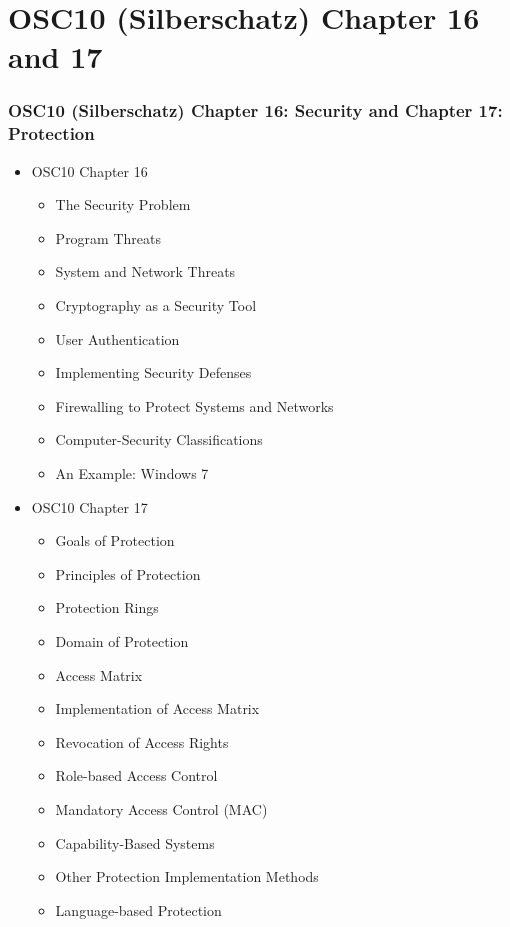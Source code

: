 \documentclass[aspectratio=169, xcolor=table, notheorems, hyperref={pdfpagelabels=false}]{beamer}
\begin{document}
\section{OSC10 (Silberschatz) Chapter 16 and 17}
\begin{frame}
\frametitle{OSC10 (Silberschatz) Chapter 16: Security and Chapter 17: Protection}
\begin{multicols}{2}
  \begin{itemize}
  \item OSC10 Chapter 16
  \begin{itemize}
  \item The Security Problem
  \item Program Threats
  \item System and Network Threats
  \item Cryptography as a Security Tool
  \item User Authentication
  \item Implementing Security Defenses
  \item Firewalling to Protect Systems and Networks
  \item Computer-Security Classifications
  \item An Example: Windows 7
  \end{itemize}
  \end{itemize}
  \vfill \null
\columnbreak
  \begin{itemize}
  \item OSC10 Chapter 17
  \begin{itemize}
  \item Goals of Protection
  \item Principles of Protection
  \item Protection Rings
  \item Domain of Protection
  \item Access Matrix
  \item Implementation of Access Matrix
  \item Revocation of Access Rights
  \item Role-based Access Control
  \item Mandatory Access Control (MAC)
  \item Capability-Based Systems
  \item Other Protection Implementation Methods
  \item Language-based Protection
  \end{itemize}
  \end{itemize}
  \vfill \null
\end{multicols}
\end{frame}
\end{document}
